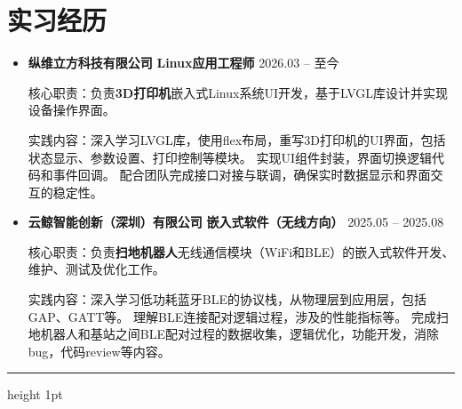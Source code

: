 \documentclass[11pt,a4paper]{article}
\begin{document}
	\section*{\textnormal{\textbf{实习经历}}}
	\begin{itemize}
		
		\item \textbf{纵维立方科技有限公司} \hfill {\textbf{Linux应用工程师}} \hfill 2026.03 -- 至今
		
		核心职责：负责\textbf{3D打印机}嵌入式Linux系统UI开发，基于LVGL库设计并实现设备操作界面。
		
		实践内容：深入学习LVGL库，使用flex布局，重写3D打印机的UI界面，包括状态显示、参数设置、打印控制等模块。
		实现UI组件封装，界面切换逻辑代码和事件回调。
		配合团队完成接口对接与联调，确保实时数据显示和界面交互的稳定性。
		
		\item \textbf{云鲸智能创新（深圳）有限公司} \hfill {\textbf{嵌入式软件（无线方向）}} \hfill {2025.05 -- 2025.08}
			
		核心职责：负责\textbf{扫地机器人}无线通信模块（WiFi和BLE）的嵌入式软件开发、维护、测试及优化工作。
			
		实践内容：深入学习低功耗蓝牙BLE的协议栈，从物理层到应用层，包括GAP、GATT等。
		理解BLE连接配对逻辑过程，涉及的性能指标等。
		完成扫地机器人和基站之间BLE配对过程的数据收集，逻辑优化，功能开发，消除bug，代码review等内容。
		

	\end{itemize}

	\vspace{1mm}
	\hrule height 1pt
	\vspace{1mm}
	
\end{document}
